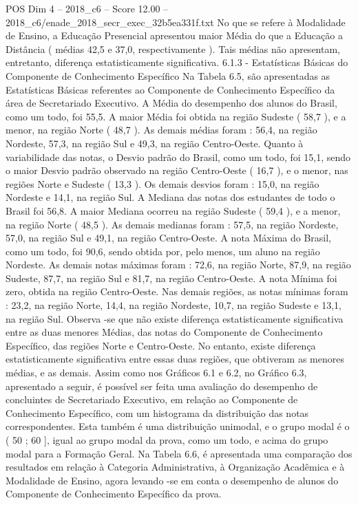 \begin{textsample}{POS Dim 4 – 2018\_c6 – Score 12.00 – 2018\_c6/enade\_2018\_secr\_exec\_32b5ea331f.txt}
No que se refere à Modalidade de Ensino, a Educação Presencial apresentou maior Média do que a Educação a Distância ( médias 42,5 e 37,0, respectivamente ).
Tais médias não apresentam, entretanto, diferença estatisticamente significativa. 6.1.3 - Estatísticas Básicas do Componente de Conhecimento Específico Na Tabela 6.5, são apresentadas as Estatísticas Básicas referentes ao Componente de Conhecimento Específico da área de Secretariado Executivo.
A Média do desempenho dos alunos do Brasil, como um todo, foi 55,5.
A maior Média foi obtida na região Sudeste ( 58,7 ), e a menor, na região Norte ( 48,7 ).
As demais médias foram : 56,4, na região Nordeste, 57,3, na região Sul e 49,3, na região Centro-Oeste.
Quanto à variabilidade das notas, o Desvio padrão do Brasil, como um todo, foi 15,1, sendo o maior Desvio padrão observado na região Centro-Oeste ( 16,7 ), e o menor, nas regiões Norte e Sudeste ( 13,3 ).
Os demais desvios foram : 15,0, na região Nordeste e 14,1, na região Sul.
A Mediana das notas dos estudantes de todo o Brasil foi 56,8.
A maior Mediana ocorreu na região Sudeste ( 59,4 ), e a menor, na região Norte ( 48,5 ).
As demais medianas foram : 57,5, na região Nordeste, 57,0, na região Sul e 49,1, na região Centro-Oeste.
A nota Máxima do Brasil, como um todo, foi 90,6, sendo obtida por, pelo menos, um aluno na região Nordeste.
As demais notas máximas foram : 72,6, na região Norte, 87,9, na região Sudeste, 87,7, na região Sul e 81,7, na região Centro-Oeste.
A nota Mínima foi zero, obtida na região Centro-Oeste.
Nas demais regiões, as notas mínimas foram : 23,2, na região Norte, 14,4, na região Nordeste, 10,7, na região Sudeste e 13,1, na região Sul.
Observa -se que não existe diferença estatisticamente significativa entre as duas menores Médias, das notas do Componente de Conhecimento Específico, das regiões Norte e Centro-Oeste.
No entanto, existe diferença estatisticamente significativa entre essas duas regiões, que obtiveram as menores médias, e as demais.
Assim como nos Gráficos 6.1 e 6.2, no Gráfico 6.3, apresentado a seguir, é possível ser feita uma avaliação do desempenho de concluintes de Secretariado Executivo, em relação ao Componente de Conhecimento Específico, com um histograma da distribuição das notas correspondentes.
Esta também é uma distribuição unimodal, e o grupo modal é o ( 50 ; 60 ], igual ao grupo modal da prova, como um todo, e acima do grupo modal para a Formação Geral.
Na Tabela 6.6, é apresentada uma comparação dos resultados em relação à Categoria Administrativa, à Organização Acadêmica e à Modalidade de Ensino, agora levando -se em conta o desempenho de alunos do Componente de Conhecimento Específico da prova.

\end{textsample}
